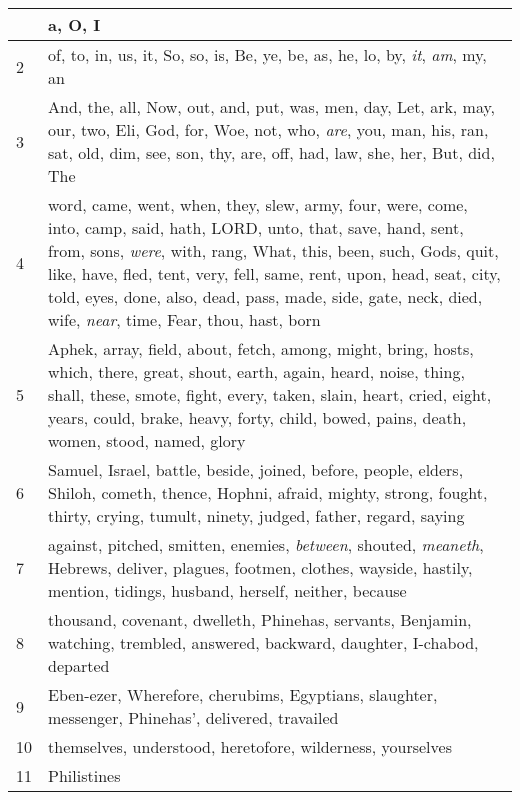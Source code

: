\begin{longtable}{l|p{3.75in}}
\hline \hline
\endlastfoot
1 & a, O, I \\ \hline
2 & of, to, in, us, it, So, so, is, Be, ye, be, as, he, lo, by, \emph{it}, \emph{am}, my, an \\ \hline
3 & And, the, all, Now, out, and, put, was, men, day, Let, ark, may, our, two, Eli, God, for, Woe, not, who, \emph{are}, you, man, his, ran, sat, old, dim, see, son, thy, are, off, had, law, she, her, But, did, The \\ \hline
4 & word, came, went, when, they, slew, army, four, were, come, into, camp, said, hath, LORD, unto, that, save, hand, sent, from, sons, \emph{were}, with, rang, What, this, been, such, Gods, quit, like, have, fled, tent, very, fell, same, rent, upon, head, seat, city, told, eyes, done, also, dead, pass, made, side, gate, neck, died, wife, \emph{near}, time, Fear, thou, hast, born \\ \hline
5 & Aphek, array, field, about, fetch, among, might, bring, hosts, which, there, great, shout, earth, again, heard, noise, thing, shall, these, smote, fight, every, taken, slain, heart, cried, eight, years, could, brake, heavy, forty, child, bowed, pains, death, women, stood, named, glory \\ \hline
6 & Samuel, Israel, battle, beside, joined, before, people, elders, Shiloh, cometh, thence, Hophni, afraid, mighty, strong, fought, thirty, crying, tumult, ninety, judged, father, regard, saying \\ \hline
7 & against, pitched, smitten, enemies, \emph{between}, shouted, \emph{meaneth}, Hebrews, deliver, plagues, footmen, clothes, wayside, hastily, mention, tidings, husband, herself, neither, because \\ \hline
8 & thousand, covenant, dwelleth, Phinehas, servants, Benjamin, watching, trembled, answered, backward, daughter, I-chabod, departed \\ \hline
9 & Eben-ezer, Wherefore, cherubims, Egyptians, slaughter, messenger, Phinehas', delivered, travailed \\ \hline
10 & themselves, understood, heretofore, wilderness, yourselves \\ \hline
11 & Philistines \\ \hline
\end{longtable}






 



